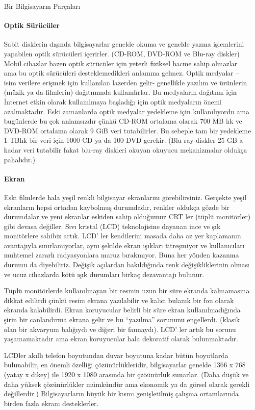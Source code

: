 \documentclass[10pt,a5paper]{book}
\begin{document}
\begin{section}{Bir Bilgisayarın Parçaları}
\paragraph{Optik Sürücüler}{Sabit disklerin dışında bilgisayarlar genelde okuma ve genelde yazma işlemlerini yapabilen optik sürücüleri içerirler. (CD-ROM, DVD-ROM ve Blu-ray diskler) Mobil cihazlar bazen optik sürücüler için yeterli fiziksel hacme sahip olmazlar ama bu optik sürücüleri desteklemedikleri anlamına gelmez. Optik medyalar – isim verilere erişmek için kullanılan lazerden gelir- genellikle yazılım ve ürünlerin (müzik ya da filmlerin) dağıtımında kullanılırlar. Bu medyaların dağıtımı için İnternet etkin olarak kullanılmaya başladığı için optik medyaların önemi azalmaktadır.}
Eski zamanlarda optik medyalar yedekleme için kullanılıyordu ama bugünlerde bu çok anlamsızdır çünkü CD-ROM ortalama olarak 700 MB lık ve DVD-ROM ortalama olarak 9 GiB veri tutabilirler. Bu sebeple tam bir yedekleme 1 TBlık bir veri için 1000 CD ya da 100 DVD gerekir. (Blu-ray diskler 25 GB a kadar veri tutabilir fakat blu-ray diskleri okuyan okuyucu mekanizmalar oldukça pahalıdır.)
\paragraph{Ekran}{Eski filmlerde hala yeşil renkli bilgisayar ekranlarını görebilirsiniz. Gerçekte yeşil ekranların hepsi ortadan kaybolmuş durumdadır, renkler oldukça gözde bir durumdalar ve yeni ekranlar eskiden sahip olduğumuz CRT ler (tüplü monitörler) gibi devasa değiller. Sıvı kristal (LCD) teknolojisine dayanan ince ve şık monitörlere sahibiz artık. LCD' ler kendilerini masada daha az yer kaplamanın avantajıyla sınırlamıyorlar, aynı şekilde ekran ışıkları titreşmiyor ve kullanıcıları muhtemel zararlı radyasyonlara maruz bırakmıyor. Buna her yönden kazanma durumu da diyebiliriz.  Değişik açılardan bakıldığında renk değişikliklerinin olması ve ucuz cihazlarda kötü ışık durumları birkaç dezavantajı bulunur.}

Tüplü monitörlerde kullanılmayan bir resmin uzun bir süre ekranda kalmamasına dikkat edilirdi çünkü resim ekrana yazılabilir ve kalıcı bulanık bir fon olarak ekranda kalabilirdi. Ekran koruyucular belirli bir süre ekran kullanılmadığında şirin bir canlandırma ekrana gelir ve bu “yazılma” sorununu engellerdi. (klasik olan bir akvaryum balığıydı ve diğeri bir faunaydı). LCD' ler artık bu sorunu yaşamamaktadır ama ekran koruyucular hala dekoratif olarak bulunmaktadır.

LCDler akıllı telefon boyutundan duvar boyutuna kadar bütün boyutlarda bulunabilir, en önemli özelliği çözünürlükleridir, bilgisayarlar genelde 1366 x 768 (yatay x dikey) ile 1920 x 1080 arasında bir çzöünürlük sunarlar. (Daha düşük ve daha yüksek çözünürlükler mümkündür ama ekonomik ya da görsel olarak gerekli değillerdir.) Bilgisayarların büyük bir kısmı genişletilmiş çalışma ortamlarında birden fazla ekranı desteklerler.


\end{section}
\end{document}
